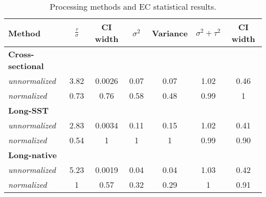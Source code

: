 
\begin{table}[h!]
\centering
\caption{Processing methods and EC statistical results.}
\begin{tabular*}{0.95\textwidth}{@{\extracolsep{\fill}} lcc|cc|cc}
\hline
Method & $\frac{\tau}{\sigma}$ & CI width& $\sigma^2$ & Variance& $\sigma^2 + \tau^2$ & CI width \\
\hline
\bf{Cross-sectional} &&&&&& \\
\quad \emph{unnormalized} & 3.82 & 0.0026  & 0.07 & 0.07 & 1.02 & \cellcolor{red} 0.46  \\
\quad \emph{normalized}   & 0.73 & 0.76  & 0.58 & 0.48 & 0.99 & \cellcolor{red} 1 \\
\bf{Long-SST} &&&&&& \\
\quad \emph{unnormalized}  & \cellcolor{red} 2.83 & \cellcolor{red} 0.0034 & \cellcolor{red} 0.11 &\cellcolor{red} 0.15 & \cellcolor{green} 1.02 & \cellcolor{green} 0.41 \\
\quad \emph{normalized}   & \cellcolor{red} 0.54 & \cellcolor{red} 1 &\cellcolor{red} 1 &\cellcolor{red} 1 & \cellcolor{green} 0.99 & \cellcolor{green} 0.90 \\
\bf{Long-native} &&&&&& \\
 \quad \emph{unnormalized}  & \cellcolor{green} 5.23 & \cellcolor{green} 0.0019 & \cellcolor{green} 0.04 & \cellcolor{green} 0.04 & \cellcolor{red} 1.03 & 0.42 \\
 \quad \emph{normalized}   & \cellcolor{green} 1 & \cellcolor{green} 0.57 & \cellcolor{green} 0.32 & \cellcolor{green} 0.29 & \cellcolor{red} 1 & 0.91 \\
\hline
\end{tabular*}
\label{table:res_tab}
\end{table}
